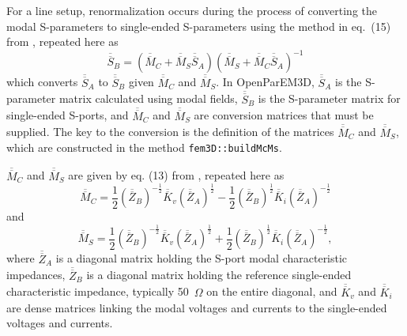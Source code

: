 \documentclass[titlepage]{article}
\renewcommand\_{\textunderscore\linebreak[1]}
\begin{document}
For a line setup, renormalization occurs during the process of converting the modal S-parameters to single-ended S-parameters using 
the method in eq.~(15) from \cite{Meyer}, repeated here as
\begin{equation}
\label{eq:single_ended_conversion}
\overline{\overline{S}}_B=\left(\overline{\overline{M}}_C + \overline{\overline{M}}_S \overline{\overline{S}}_A\right)\left(\overline{\overline{M}}_S + \overline{\overline{M}}_C \overline{\overline{S}}_A\right)^{-1}
\end{equation}
which converts $\overline{\overline{S}}_A$ to $\overline{\overline{S}}_B$ given $\overline{\overline{M}}_C$ and $\overline{\overline{M}}_S$.  In OpenParEM3D, $\overline{\overline{S}}_A$ is the S-parameter matrix calculated using modal fields, $\overline{\overline{S}}_B$ is the S-parameter matrix for single-ended S-ports, and $\overline{\overline{M}}_C$ and $\overline{\overline{M}}_S$ are conversion matrices that must be supplied.  The key to the conversion is the definition of the matrices $\overline{\overline{M}}_C$ and $\overline{\overline{M}}_S$, which are constructed in the method \texttt{fem3D::build\_Mc\_Ms}.

$\overline{\overline{M}}_C$ and $\overline{\overline{M}}_S$ are given by eq. (13) from \cite{Meyer}, repeated here as
\begin{equation}
\overline{\overline{M}}_C=\frac{1}{2}\left(\overline{\overline{Z}}_B\right)^{-\frac{1}{2}}\overline{\overline{K}}_v\left(\overline{\overline{Z}}_A\right)^{\frac{1}{2}}-\frac{1}{2}\left(\overline{\overline{Z}}_B\right)^{\frac{1}{2}}\overline{\overline{K}}_i\left(\overline{\overline{Z}}_A\right)^{-\frac{1}{2}}
\end{equation}
and
\begin{equation}
\overline{\overline{M}}_S=\frac{1}{2}\left(\overline{\overline{Z}}_B\right)^{-\frac{1}{2}}\overline{\overline{K}}_v\left(\overline{\overline{Z}}_A\right)^{\frac{1}{2}}+\frac{1}{2}\left(\overline{\overline{Z}}_B\right)^{\frac{1}{2}}\overline{\overline{K}}_i\left(\overline{\overline{Z}}_A\right)^{-\frac{1}{2}},
\end{equation}
where $\overline{\overline{Z}}_A$ is a diagonal matrix holding the S-port modal characteristic impedances, $\overline{\overline{Z}}_B$ is a diagonal matrix holding the reference single-ended characteristic impedance, typically 50~$\Omega$ on the entire diagonal, and $\overline{\overline{K}}_v$ and $\overline{\overline{K}}_i$ are dense matrices linking the modal voltages and currents to the single-ended voltages and currents.
\end{document}
